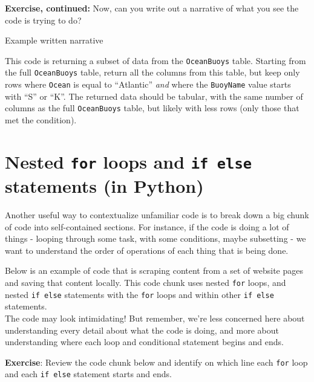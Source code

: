 \documentclass[
]{book}
\begin{document}
\hfill\break

\textbf{Exercise, continued:} Now, can you write out a narrative of what you see the code is trying to do?

Example written narrative

This code is returning a subset of data from the \texttt{OceanBuoys} table. Starting from the full \texttt{OceanBuoys} table, return all the columns from this table, but keep only rows where \texttt{Ocean} is equal to ``Atlantic'' \emph{and} where the \texttt{BuoyName} value starts with ``S'' or ``K''. The returned data should be tabular, with the same number of columns as the full \texttt{OceanBuoys} table, but likely with less rows (only those that met the condition).

\hfill\break

\section{\texorpdfstring{Nested \texttt{for} loops and \texttt{if\ else} statements (in Python)}{Nested for loops and if else statements (in Python)}}\label{nested-for-loops-and-if-else-statements-in-python}

Another useful way to contextualize unfamiliar code is to break down a big chunk of code into self-contained sections. For instance, if the code is doing a lot of things - looping through some task, with some conditions, maybe subsetting - we want to understand the order of operations of each thing that is being done.

Below is an example of code that is scraping content from a set of website pages and saving that content locally. This code chunk uses nested \texttt{for} loops, and nested \texttt{if\ else} statements with the \texttt{for} loops and within other \texttt{if\ else} statements.\\

The code may look intimidating! But remember, we're less concerned here about understanding every detail about what the code is doing, and more about understanding where each loop and conditional statement begins and ends.

\textbf{Exercise}: Review the code chunk below and identify on which line each \texttt{for} loop and each \texttt{if\ else} statement starts and ends.
\end{document}

